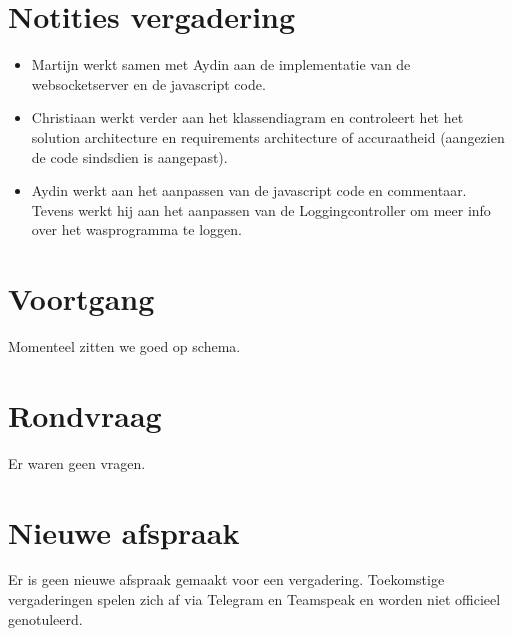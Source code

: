 \documentclass[dutch]{hu}
\begin{document}
\section{Notities vergadering}
\begin{itemize}

\item Martijn werkt samen met Aydin aan de implementatie van de websocketserver en de javascript code.
\item Christiaan werkt verder aan het klassendiagram en controleert het het solution architecture en requirements architecture of accuraatheid (aangezien de code sindsdien is aangepast).
\item Aydin werkt aan het aanpassen van de javascript code en commentaar. Tevens werkt hij aan het aanpassen van de Loggingcontroller om meer info over het wasprogramma te loggen.

\end{itemize}

\section{Voortgang}
Momenteel zitten we goed op schema.

\section{Rondvraag}
Er waren geen vragen.

\section{Nieuwe afspraak}
Er is geen nieuwe afspraak gemaakt voor een vergadering. Toekomstige vergaderingen spelen zich af via Telegram en Teamspeak en worden niet officieel genotuleerd.
\end{document}
